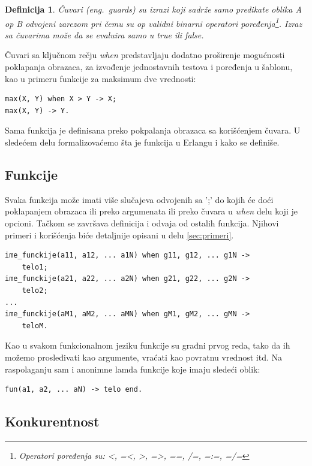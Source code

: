 \documentclass[a4paper]{article}
\newtheorem{definition}{Definicija}
\begin{document}
{\begin{definition}{Čuvari (eng.~{\em guards})}
su izrazi koji sadrže samo predikate oblika A op B odvojeni zarezom pri čemu su op validni binarni operatori poređenja\footnote{Operatori poređenja su: <, =<, >, =>, ==, /=, =:=, =/=}. Izraz sa čuvarima može da se evaluira samo u true ili false.
\end{definition}
Čuvari sa ključnom rečju {\em when} predstavljaju dodatno proširenje mogućnosti poklapanja obrazaca, za izvođenje jednostavnih testova i poređenja u šablonu, kao u primeru funkcije za maksimum dve vrednosti:

\begin{verbatim}
max(X, Y) when X > Y -> X;
max(X, Y) -> Y.
\end{verbatim}

Sama funkcija je definisana preko pokpalanja obrazaca sa korišćenjem čuvara. U sledećem delu formalizovaćemo šta je funkcija u Erlangu i kako se definiše.



\subsection{Funkcije}

Svaka funkcija može imati više slučajeva odvojenih sa ';' 
do kojih će doći poklapanjem obrazaca ili preko argumenata ili preko čuvara u {\em when} delu koji je opcioni. 
Tačkom se završava definicija i odvaja od ostalih funkcija. 
Njihovi primeri i korišćenja biće detaljnije opisani u delu \ref{sec:primeri}.

\begin{verbatim}
ime_funckije(a11, a12, ... a1N) when g11, g12, ... g1N -> 
	telo1;
ime_funckije(a21, a22, ... a2N) when g21, g22, ... g2N -> 
	telo2;
...
ime_funckije(aM1, aM2, ... aMN) when gM1, gM2, ... gMN -> 
	teloM.
\end{verbatim}

Kao u svakom funkcionalnom jeziku funkcije su građni prvog reda, 
tako da ih možemo prosleđivati kao argumente, vraćati kao povratnu vrednost itd. Na raspolaganju sam i anonimne lamda funkcije koje imaju sledeći oblik:

\begin{verbatim}
fun(a1, a2, ... aN) -> telo end.
\end{verbatim}




\subsection{Konkurentnost}
\label{subsec:konkurentnost}

}
\end{document}
